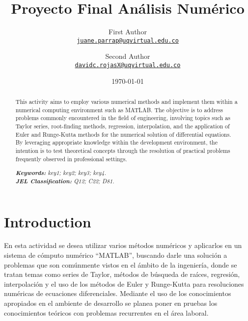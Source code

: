 \documentclass[11pt]{article}
\title{Proyecto Final Análisis Numérico}
\author{First Author\\%
    \href{mailto:juane.parrap@uqvirtual.edu.co}{\texttt{juane.parrap@uqvirtual.edu.co}} %
\and Second Author\\%
    \href{mailto:secondauthor@ufl.edu}{\texttt{davidc.rojasX@uqvirtual.edu.co}} %
   }
\date{\today}
\begin{document}
{
\maketitle
\begin{abstract}

This activity aims to employ various numerical methods and implement them within a numerical computing environment such as MATLAB. The objective is to address problems commonly encountered in the field of engineering, involving topics such as Taylor series, root-finding methods, regression, interpolation, and the application of Euler and Runge-Kutta methods for the numerical solution of differential equations.
By leveraging appropriate knowledge within the development environment, the intention is to test theoretical concepts through the resolution of practical problems frequently observed in professional settings.

	\noindent
	\textit{\textbf{Keywords: }%
		key1; key2; key3; key4.} \\ %
	\noindent
	\textit{\textbf{JEL Classification: }%
		Q12; C22; D81.} %

\end{abstract}
}


\section{Introduction}

En esta actividad se desea utilizar varios métodos numéricos y aplicarlos en un sistema de cómputo numérico  “MATLAB”, buscando darle una solución a problemas que son comúnmente vistos en el ámbito de la ingeniería, donde se tratan temas como series de Taylor, métodos de búsqueda de raíces, regresión, interpolación y el uso de los métodos de Euler y Runge-Kutta para resoluciones numéricas de ecuaciones diferenciales.
Mediante el uso de los conocimientos apropiados en el ambiente de desarrollo se planea poner en pruebas los conocimientos teóricos con problemas recurrentes en el área laboral. 
\end{document}
